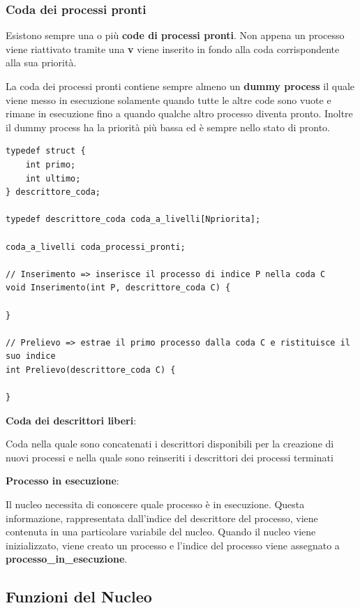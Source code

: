 \documentclass{article}
\begin{document}
\subsubsection{Coda dei processi pronti}

Esistono sempre una o più \textbf{code di processi pronti}. Non appena un processo viene riattivato tramite una \textbf{v} viene
inserito in fondo alla coda corrispondente alla sua priorità.

La coda dei processi pronti contiene sempre almeno un \textbf{dummy process} il quale viene messo in esecuzione solamente quando tutte
le altre code sono vuote e rimane in esecuzione fino a quando qualche altro processo diventa pronto. Inoltre il dummy process ha
la priorità più bassa ed è sempre nello stato di pronto.

\vspace{3mm}
\begin{lstlisting}[caption={Esempio di realizzazione coda dei processi pronti}]
typedef struct {
    int primo;
    int ultimo;
} descrittore_coda;

typedef descrittore_coda coda_a_livelli[Npriorita];

coda_a_livelli coda_processi_pronti;

// Inserimento => inserisce il processo di indice P nella coda C
void Inserimento(int P, descrittore_coda C) {

}

// Prelievo => estrae il primo processo dalla coda C e ristituisce il suo indice
int Prelievo(descrittore_coda C) {

}
\end{lstlisting}

\textbf{Coda dei descrittori liberi}:

Coda nella quale sono concatenati i descrittori disponibili per la creazione di nuovi processi
e nella quale sono reinseriti i descrittori dei processi terminati

\vspace{3mm}
\textbf{Processo in esecuzione}:

Il nucleo necessita di conoscere quale processo è in esecuzione. Questa informazione, rappresentata dall'indice del descrittore
del processo, viene contenuta in una particolare variabile del nucleo. Quando il nucleo viene inizializzato, viene creato un processo
e l'indice del processo viene assegnato a \textbf{processo_in_esecuzione}.

\subsection{Funzioni del Nucleo}
\end{document}
